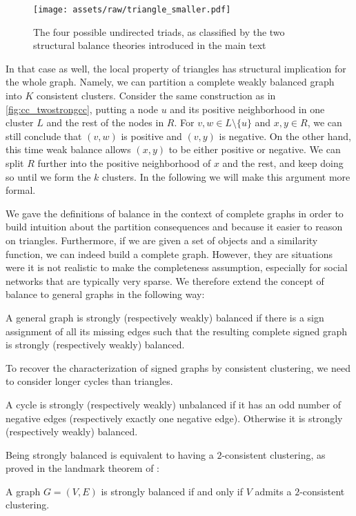 \begin{figure}[htpb]
	\centering
	\texttt{[image: assets/raw/triangle\_smaller.pdf]}
	\caption{The four possible undirected triads, as classified by the two structural balance theories
	introduced in the main text} \label{fig:cc_balance}
\end{figure}

In that case as well, the local property of triangles has structural implication for the whole graph.
Namely, we can partition a complete weakly balanced graph into $K$ consistent clusters. 
Consider the same construction as in
\autoref{fig:cc_twostrongcc}, putting a node $u$ and its positive neighborhood in one cluster $L$ and
the rest of the nodes in $R$. For $v,w\in L\setminus \{u\}$ and $x,y\in R$, we can still conclude
that $(v,w)$ is positive and $(v,y)$ is negative. On the other hand, this time weak balance allows
$(x,y)$ to be either positive or negative. We can split $R$ further into the positive neighborhood of
$x$ and the rest, and keep doing so until we form the $k$ clusters. In the following we will make
this argument more formal.

We gave the definitions of balance in the context of complete graphs in order to build intuition
about the partition consequences and because it easier to reason on triangles. Furthermore, if we are
given a set of objects and a similarity function, we can indeed build a complete graph. However,
they are situations were it is not realistic to make the completeness assumption, especially for
social networks that are typically very sparse. We therefore extend the concept of balance to
general graphs in the following way:
\begin{definition}
  A general graph is strongly (respectively weakly) balanced if there is a sign assignment of all its
  missing edges such that the resulting complete signed graph is strongly (respectively weakly)
  balanced.
\end{definition}
To recover the characterization of signed graphs by consistent clustering, we need to
consider longer cycles than triangles.
\begin{definition}
  A cycle is strongly (respectively weakly) unbalanced if it has an odd number of negative edges
  (respectively exactly one negative edge). Otherwise it is strongly (respectively weakly) balanced.
\end{definition}

Being strongly balanced is equivalent to having a $2$-consistent clustering, as proved in the landmark
theorem of \textcite[Theorem 3]{harary1953}:
\begin{theorem}\label{thm:structural}
  A graph $G=(V,E)$ is strongly balanced if and only if $V$ admits a $2$-consistent clustering.
\end{theorem}

